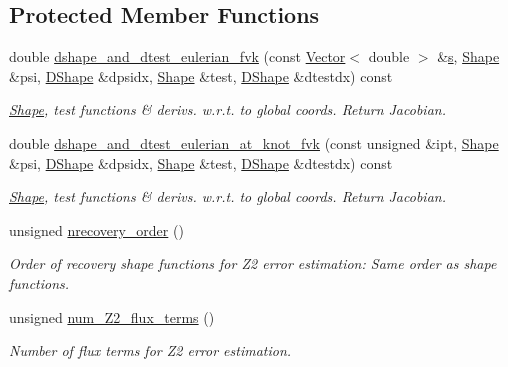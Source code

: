 \subsection*{Protected Member Functions}
\begin{DoxyCompactItemize}
\item 
double \hyperlink{classoomph_1_1TFoepplvonKarmanElement_aee55fcd80bf4f6ea2550a43216e8e1c0}{dshape\+\_\+and\+\_\+dtest\+\_\+eulerian\+\_\+fvk} (const \hyperlink{classoomph_1_1Vector}{Vector}$<$ double $>$ \&\hyperlink{cfortran_8h_ab7123126e4885ef647dd9c6e3807a21c}{s}, \hyperlink{classoomph_1_1Shape}{Shape} \&psi, \hyperlink{classoomph_1_1DShape}{D\+Shape} \&dpsidx, \hyperlink{classoomph_1_1Shape}{Shape} \&test, \hyperlink{classoomph_1_1DShape}{D\+Shape} \&dtestdx) const
\begin{DoxyCompactList}\small\item\em \hyperlink{classoomph_1_1Shape}{Shape}, test functions \& derivs. w.\+r.\+t. to global coords. Return Jacobian. \end{DoxyCompactList}\item 
double \hyperlink{classoomph_1_1TFoepplvonKarmanElement_a47009097d667db8345785599cb3bdb81}{dshape\+\_\+and\+\_\+dtest\+\_\+eulerian\+\_\+at\+\_\+knot\+\_\+fvk} (const unsigned \&ipt, \hyperlink{classoomph_1_1Shape}{Shape} \&psi, \hyperlink{classoomph_1_1DShape}{D\+Shape} \&dpsidx, \hyperlink{classoomph_1_1Shape}{Shape} \&test, \hyperlink{classoomph_1_1DShape}{D\+Shape} \&dtestdx) const
\begin{DoxyCompactList}\small\item\em \hyperlink{classoomph_1_1Shape}{Shape}, test functions \& derivs. w.\+r.\+t. to global coords. Return Jacobian. \end{DoxyCompactList}\item 
unsigned \hyperlink{classoomph_1_1TFoepplvonKarmanElement_a772d3db8d92b7cfd1a29984c8a92d0eb}{nrecovery\+\_\+order} ()
\begin{DoxyCompactList}\small\item\em Order of recovery shape functions for Z2 error estimation\+: Same order as shape functions. \end{DoxyCompactList}\item 
unsigned \hyperlink{classoomph_1_1TFoepplvonKarmanElement_a9ffd9e45449f8e542a3137ee73b56b5b}{num\+\_\+\+Z2\+\_\+flux\+\_\+terms} ()
\begin{DoxyCompactList}\small\item\em Number of \textquotesingle{}flux\textquotesingle{} terms for Z2 error estimation. \end{DoxyCompactList}\item 

\end{DoxyCompactItemize}
